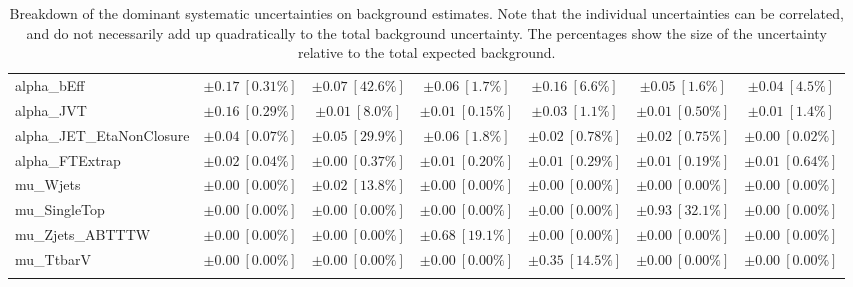 \begin{sidewaystable}
\begin{center}
\begin{tabular*}{\textwidth}{@{\extracolsep{\fill}}lcccccc}
alpha\_bEff         & $\pm 0.17\ [0.31\%] $          & $\pm 0.07\ [42.6\%] $          & $\pm 0.06\ [1.7\%] $          & $\pm 0.16\ [6.6\%] $          & $\pm 0.05\ [1.6\%] $          & $\pm 0.04\ [4.5\%] $       \\
alpha\_JVT         & $\pm 0.16\ [0.29\%] $          & $\pm 0.01\ [8.0\%] $          & $\pm 0.01\ [0.15\%] $          & $\pm 0.03\ [1.1\%] $          & $\pm 0.01\ [0.50\%] $          & $\pm 0.01\ [1.4\%] $       \\
alpha\_JET\_EtaNonClosure         & $\pm 0.04\ [0.07\%] $          & $\pm 0.05\ [29.9\%] $          & $\pm 0.06\ [1.8\%] $          & $\pm 0.02\ [0.78\%] $          & $\pm 0.02\ [0.75\%] $          & $\pm 0.00\ [0.02\%] $       \\
alpha\_FTExtrap         & $\pm 0.02\ [0.04\%] $          & $\pm 0.00\ [0.37\%] $          & $\pm 0.01\ [0.20\%] $          & $\pm 0.01\ [0.29\%] $          & $\pm 0.01\ [0.19\%] $          & $\pm 0.01\ [0.64\%] $       \\
mu\_Wjets         & $\pm 0.00\ [0.00\%] $          & $\pm 0.02\ [13.8\%] $          & $\pm 0.00\ [0.00\%] $          & $\pm 0.00\ [0.00\%] $          & $\pm 0.00\ [0.00\%] $          & $\pm 0.00\ [0.00\%] $       \\
mu\_SingleTop         & $\pm 0.00\ [0.00\%] $          & $\pm 0.00\ [0.00\%] $          & $\pm 0.00\ [0.00\%] $          & $\pm 0.00\ [0.00\%] $          & $\pm 0.93\ [32.1\%] $          & $\pm 0.00\ [0.00\%] $       \\
mu\_Zjets\_ABTTTW         & $\pm 0.00\ [0.00\%] $          & $\pm 0.00\ [0.00\%] $          & $\pm 0.68\ [19.1\%] $          & $\pm 0.00\ [0.00\%] $          & $\pm 0.00\ [0.00\%] $          & $\pm 0.00\ [0.00\%] $       \\
mu\_TtbarV         & $\pm 0.00\ [0.00\%] $          & $\pm 0.00\ [0.00\%] $          & $\pm 0.00\ [0.00\%] $          & $\pm 0.35\ [14.5\%] $          & $\pm 0.00\ [0.00\%] $          & $\pm 0.00\ [0.00\%] $       \\
\noalign{\smallskip}\hline\noalign{\smallskip}
\end{tabular*}
\end{center}
\caption[Breakdown of uncertainty on background estimates]{
Breakdown of the dominant systematic uncertainties on background estimates.
Note that the individual uncertainties can be correlated, and do not necessarily add up quadratically to 
the total background uncertainty. The percentages show the size of the uncertainty relative to the total expected background.
\label{table.results.bkgestimate.uncertainties.VRTopATW_bybkg}}
\end{sidewaystable}
%